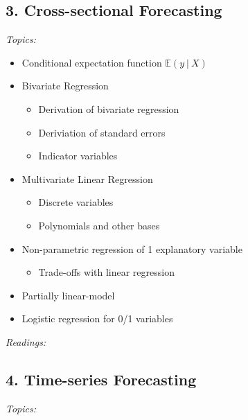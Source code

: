 \documentclass[12pt]{article}
\begin{document}
\subsection*{3. Cross-sectional Forecasting}

\noindent\emph{Topics:}

\begin{itemize}
  \item Conditional expectation function $\mathbb{E}(y \ \vert \ X)$
  \item Bivariate Regression 
  \begin{itemize}
    \item Derivation of bivariate regression
    \item Deriviation of standard errors 
    \item Indicator variables
  \end{itemize}

  \item Multivariate Linear Regression
  \begin{itemize}
    \item Discrete variables
    \item Polynomials and other bases
  \end{itemize}

  \item Non-parametric regression of 1 explanatory variable
  \begin{itemize}
    \item Trade-offs with linear regression
  \end{itemize}

  \item Partially linear-model
  
  \item Logistic regression for 0/1 variables
\end{itemize}

\bigskip
\noindent\emph{Readings:}


\subsection*{4. Time-series Forecasting}

\noindent\emph{Topics:}
\end{document}
